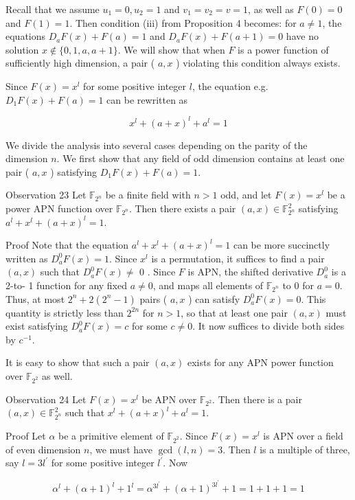 \documentclass[10pt]{article}
\begin{document}
Recall that we assume $u_{1}=0, u_{2}=1$ and $v_{1}=v_{2}=v=1$, as well as $F(0)=0$ and $F(1)=1$. Then condition (iii) from Proposition 4 becomes: for $a \neq 1$, the equations $D_{a} F(x)+F(a)=1$ and $D_{a} F(x)+F(a+1)=0$ have no solution $x \notin\{0,1, a, a+1\}$. We will show that when $F$ is a power function of sufficiently high dimension, a pair ( $a, x$ ) violating this condition always exists.

Since $F(x)=x^{l}$ for some positive integer $l$, the equation e.g. $D_{1} F(x)+F(a)=1$ can be rewritten as

$$
x^{l}+(a+x)^{l}+a^{l}=1
$$

We divide the analysis into several cases depending on the parity of the dimension $n$. We first show that any field of odd dimension contains at least one pair ( $a, x$ ) satisfying $D_{1} F(x)+F(a)=1$.

Observation 23 Let $\mathbb{F}_{2^{n}}$ be a finite field with $n>1$ odd, and let $F(x)=x^{l}$ be a power APN function over $\mathbb{F}_{2^{n}}$. Then there exists a pair $(a, x) \in \mathbb{F}_{2^{n}}^{2}$ satisfying $a^{l}+x^{l}+(a+x)^{l}=1$.

Proof Note that the equation $a^{l}+x^{l}+(a+x)^{l}=1$ can be more succinctly written as $D_{a}^{0} F(x)=1$. Since $x^{l}$ is a permutation, it suffices to find a pair $(a, x)$ such that $D_{a}^{0} F(x) \neq$ 0 . Since $F$ is APN, the shifted derivative $D_{a}^{0}$ is a 2-to- 1 function for any fixed $a \neq 0$, and maps all elements of $\mathbb{F}_{2^{n}}$ to 0 for $a=0$. Thus, at most $2^{n}+2\left(2^{n}-1\right)$ pairs ( $a, x$ ) can satisfy $D_{a}^{0} F(x)=0$. This quantity is strictly less than $2^{2 n}$ for $n>1$, so that at least one pair $(a, x)$ must exist satisfying $D_{a}^{0} F(x)=c$ for some $c \neq 0$. It now suffices to divide both sides by $c^{-1}$.

It is easy to show that such a pair $(a, x)$ exists for any APN power function over $\mathbb{F}_{2^{2}}$ as well.

Observation 24 Let $F(x)=x^{l}$ be APN over $\mathbb{F}_{2^{2}}$. Then there is a pair $(a, x) \in \mathbb{F}_{2^{n}}^{2}$ such that $x^{l}+(a+x)^{l}+a^{l}=1$.

Proof Let $\alpha$ be a primitive element of $\mathbb{F}_{2^{2}}$. Since $F(x)=x^{l}$ is APN over a field of even dimension $n$, we must have $\operatorname{gcd}(l, n)=3$. Then $l$ is a multiple of three, say $l=3 l^{\prime}$ for some positive integer $l^{\prime}$. Now

$$
\alpha^{l}+(\alpha+1)^{l}+1^{l}=\alpha^{3 l^{\prime}}+(\alpha+1)^{3 l^{\prime}}+1=1+1+1=1
$$
\end{document}
